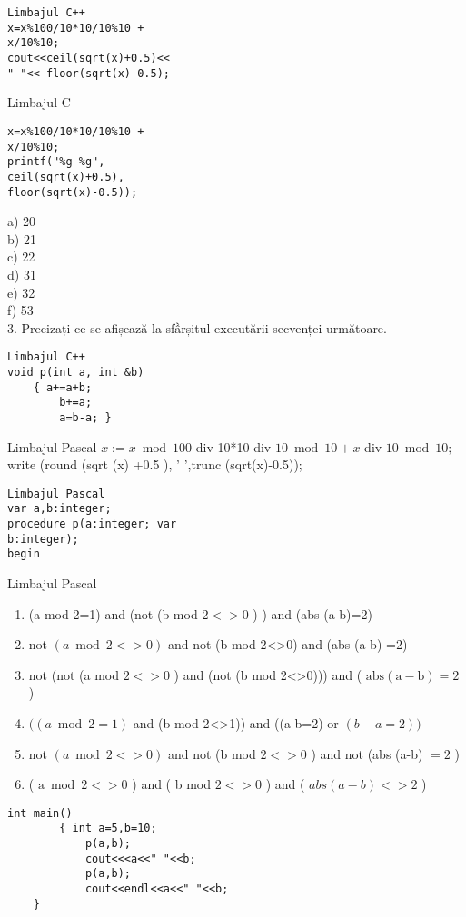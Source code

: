 \begin{verbatim}
Limbajul C++
x=x%100/10*10/10%10 +
x/10%10;
cout<<ceil(sqrt(x)+0.5)<<
" "<< floor(sqrt(x)-0.5);
\end{verbatim}

Limbajul C

\begin{verbatim}
x=x%100/10*10/10%10 +
x/10%10;
printf("%g %g",
ceil(sqrt(x)+0.5),
floor(sqrt(x)-0.5));
\end{verbatim}

a) 20\\
b) 21\\
c) 22\\
d) 31\\
e) 32\\
f) 53\\
3. Precizați ce se afișează la sfầrșitul executării secvenței următoare.

\begin{verbatim}
Limbajul C++
void p(int a, int &b)
    { a+=a+b;
        b+=a;
        a=b-a; }
\end{verbatim}

Limbajul Pascal $x:=x \bmod 100$ div 10*10 div $10 \bmod 10+x$ div $10 \bmod 10 ;$ write (round (sqrt (x) +0.5 ), ' ',trunc (sqrt(x)-0.5));

\begin{verbatim}
Limbajul Pascal
var a,b:integer;
procedure p(a:integer; var
b:integer);
begin
\end{verbatim}

Limbajul Pascal

\begin{enumerate}
  \item (a mod 2=1) and (not (b mod $2<>0$ ) ) and (abs (a-b)=2)
  \item not $(a \bmod 2<>0)$ and not (b mod 2<>0) and (abs (a-b) =2)
  \item not (not (a mod $2<>0$ ) and (not (b mod 2<>0))) and ( $\mathrm{abs}(\mathrm{a}-\mathrm{b})=2$ )
  \item $((a \bmod 2=1)$ and (b mod 2<>1)) and ((a-b=2) or $(b-a=2))$
  \item not $(a \bmod 2<>0)$ and not (b mod $2<>0$ ) and not (abs (a-b) $=2$ )
  \item ( $\mathrm{a} \bmod 2<>0$ ) and ( b mod $2<>0$ ) and ( $a b s(a-b)<>2$ )
\end{enumerate}

\begin{verbatim}
int main()
        { int a=5,b=10;
            p(a,b);
            cout<<<a<<" "<<b;
            p(a,b);
            cout<<endl<<a<<" "<<b;
    }
\end{verbatim}

